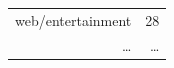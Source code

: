 \documentclass[xcolor=x11names,compress,handout]{beamer}
\begin{document}
{\begin{columns}
\begin{table}[ht]
\begin{tabular}{rr}
                web/entertainment &  28 \\ 
                \ldots & \ldots \\

\end{tabular}
\end{table}
\end{columns}}
\end{document}
